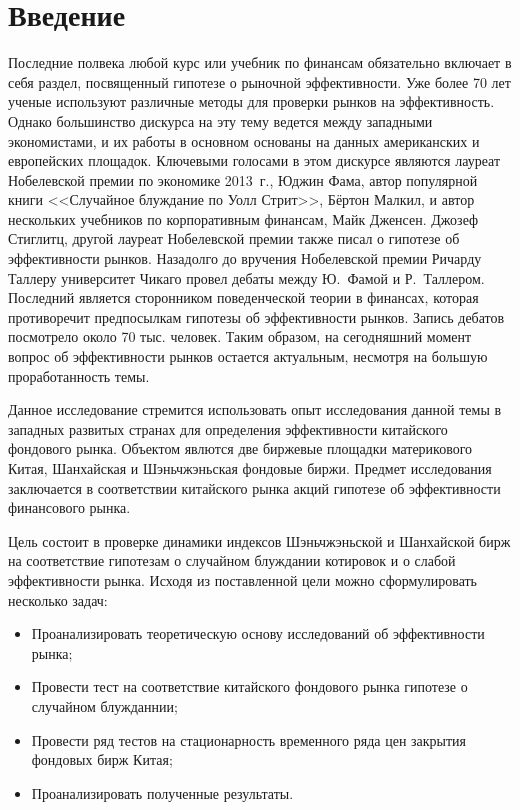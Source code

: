 \documentclass[a4paper,12pt]{article}
\begin{document}
\newpage
\tableofcontents
\thispagestyle{empty}
\newpage
\section{Введение}

Последние полвека любой курс или учебник по финансам обязательно включает в себя раздел, посвященный гипотезе о рыночной эффективности. Уже более 70 лет ученые используют различные методы для проверки рынков на эффективность. Однако большинство дискурса на эту тему ведется между западными экономистами, и их работы в основном основаны на данных американских и европейских площадок. Ключевыми голосами в этом дискурсе являются лауреат Нобелевской премии по экономике 2013~г., Юджин Фама, автор популярной книги <<Случайное блуждание по Уолл Стрит>>, Бёртон Малкил, и автор нескольких учебников по корпоративным финансам, Майк Дженсен. Джозеф Стиглитц, другой лауреат Нобелевской премии также писал о гипотезе об эффективности рынков. Назадолго до вручения Нобелевской премии Ричарду Таллеру университет Чикаго провел дебаты между Ю.~Фамой и Р.~Таллером. Последний является сторонником поведенческой теории в финансах, которая противоречит предпосылкам гипотезы об эффективности рынков. Запись дебатов посмотрело около 70 тыс. человек. Таким образом, на сегодняшний момент вопрос об эффективности рынков остается актуальным, несмотря на большую проработанность темы.

Данное исследование стремится использовать опыт исследования данной темы в западных развитых странах для определения эффективности китайского фондового рынка. Объектом явлются две биржевые площадки материкового Китая, Шанхайская и Шэньчжэньская фондовые биржи. Предмет исследования заключается в соответствии китайского рынка акций гипотезе об эффективности финансового рынка.

Цель состоит в проверке динамики индексов Шэньчжэньской и Шанхайской бирж на соответствие гипотезам о случайном блуждании котировок и о слабой эффективности рынка. Исходя из поставленной цели можно сформулировать несколько задач:
\begin{itemize}
  \item Проанализировать теоретическую основу исследований об эффективности рынка;
  \item Провести тест на соответствие китайского фондового рынка гипотезе о случайном блужданнии;
  \item Провести ряд тестов на стационарность временного ряда цен закрытия фондовых бирж Китая;
  \item Проанализировать полученные результаты.
\end{itemize}
\end{document}
